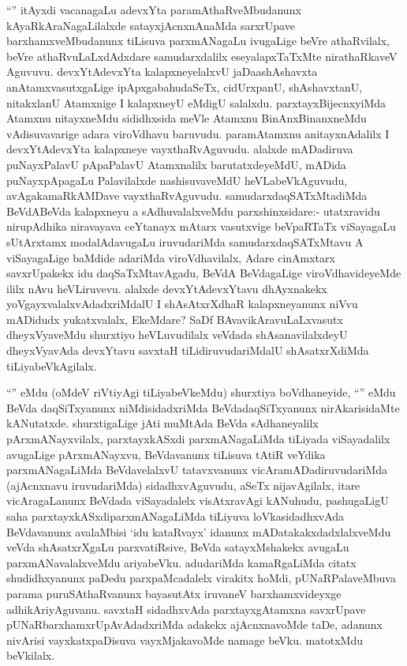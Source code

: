 \begin{artha}
``\stext'' itAyxdi vacanagaLu adevxYta paramAthaRveMbudanunx kAyaRkAraNagaLilalxde satayxjAcnxnAnaMda sarxrUpave barxhamxveMbudanunx tiLisuva parxmANagaLu ivugaLige beVre athaRvilalx, beVre athaRvuLaLxdAdxdare samudarxdalilx eseyalapxTaTxMte nirathaRkaveV Aguvuvu. devxYtAdevxYta kalapxneyelalxvU jaDaashAshavxta anAtamxvasutxgaLige ipApxgabahudaSeTx, cidUrxpanU, shAshavxtanU, nitakxlanU Atamxnige I kalapxneyU eMdigU salalxdu. parxtayxBijecnxyiMda Atamxnu nitayxneMdu sididhxsida meVle Atamxnu BinAnxBinanxneMdu vAdisuvavarige adara viroVdhavu baruvudu. paramAtamxnu anitayxnAdalilx I devxYtAdevxYta kalapxneye vayxthaRvAguvudu. alalxde mADadiruva puNayxPalavU pApaPalavU Atamxnalilx barutatxdeyeMdU, mADida puNayxpApagaLu Palavilalxde nashisuvaveMdU heVLabeVkAguvudu, avAgakamaRkAMDave vayxthaRvAguvudu. samudarxdaqSATxMtadiMda BeVdABeVda kalapxneyu a sAdhuvalalxveMdu parxshinxsidare:- utatxravidu nirupAdhika niravayava ceYtanayx mAtarx vasutxvige beVpaRTaTx viSayagaLu sUtArxtamx modalAdavugaLu iruvudariMda samudarxdaqSATxMtavu A viSayagaLige baMdide adariMda viroVdhavilalx, Adare cinAmxtarx savxrUpakekx idu daqSaTxMtavAgadu, BeVdA BeVdagaLige viroVdhavideyeMde ililx nAvu heVLiruvevu. alalxde devxYtAdevxYtavu dhAyxnakekx yoVgayxvalalxvAdadxriMdalU I shAsAtxrXdhaR kalapxneyanunx niVvu mADidudx yukatxvalalx, EkeMdare? SaDf BAvavikAravuLaLxvasutx dheyxVyaveMdu shurxtiyo heVLuvudilalx veVdada shAsanavilalxdeyU dheyxVyavAda devxYtavu savxtaH tiLidiruvudariMdalU shAsatxrXdiMda tiLiyabeVkAgilalx.
\end{artha}

\begin{artha}
``\stext'' eMdu (oMdeV riVtiyAgi tiLiyabeVkeMdu) shurxtiya boVdhaneyide, ``\stext'' eMdu BeVda daqSiTxyanunx niMdisidadxriMda BeVdadaqSiTxyanunx nirAkarisidaMte kANutatxde. shurxtigaLige jAti muMtAda BeVda sAdhaneyalilx pArxmANayxvilalx, parxtayxkASxdi parxmANagaLiMda tiLiyada viSayadalilx avugaLige pArxmANayxvu, BeVdavanunx tiLisuva tAtiR veYdika parxmANagaLiMda BeVdavelalxvU tatavxvanunx vicAramADadiruvudariMda (ajAcnxnavu iruvudariMda) sidadhxvAguvudu, aSeTx nijavAgilalx, itare vicAragaLanunx BeVdada viSayadalelx visAtxravAgi kANuhudu, pashugaLigU saha parxtayxkASxdiparxmANagaLiMda tiLiyuva loVkasidadhxvAda BeVdavanunx avalaMbisi `idu kataRvayx' idanunx mADatakakxdadxlalxveMdu veVda shAsatxrXgaLu parxvatiRsive, BeVda satayxMshakekx avugaLu parxmANavalalxveMdu ariyabeVku. adudariMda kamaRgaLiMda citatx shudidhxyanunx paDedu parxpaMcadalelx virakitx hoMdi, pUNaRPalaveMbuva parama puruSAthaRvanunx bayasutAtx iruvaneV barxhamxvideyxge adhikAriyAguvanu. savxtaH sidadhxvAda parxtayxgAtamxna savxrUpave pUNaRbarxhamxrUpAvAdadxriMda adakekx ajAcnxnavoMde taDe, adanunx nivArisi vayxkatxpaDisuva vayxMjakavoMde namage beVku. matotxMdu beVkilalx.
\end{artha}

